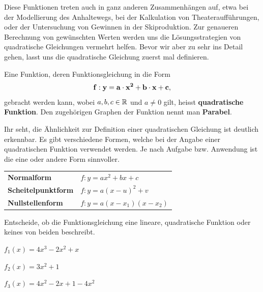 \documentclass[11pt,oneside]{article}
\begin{document}
	Diese Funktionen treten auch in ganz anderen Zusammenhängen auf, etwa bei der Modellierung des Anhaltewegs, bei der Kalkulation von Theateraufführungen, oder der Untersuchung von Gewinnen in der Skiproduktion. Zur genaueren Berechnung von gewünschten Werten werden uns die Lösungsstrategien von quadratische Gleichungen vermehrt helfen. Bevor wir aber zu sehr ins Detail gehen, lasst uns die quadratische Gleichung zuerst mal definieren.
	\begin{definition}
		Eine Funktion, deren Funktionsgleichung in die Form \[\mathbf{f:y=a\cdot x^2+b\cdot x+c,}\] gebracht werden kann, wobei $a,b,c\in\mathbb{R}$ und $a\neq0$ gilt, heisst \textbf{quadratische Funktion}.\newline
		Den zugehörigen Graphen der Funktion nennt man \textbf{Parabel}.
	\end{definition}
	Ihr seht, die Ähnlichkeit zur Definition einer quadratischen Gleichung ist deutlich erkennbar. Es gibt verschiedene Formen, welche bei der Angabe einer quadratischen Funktion verwendet werden. Je nach Aufgabe bzw. Anwendung ist die eine oder andere Form sinnvoller.
	\begin{definition}
		\begingroup
		\renewcommand{\arraystretch}{1.5}
		\begin{table}[H]
			\centering
			\begin{tabular}{p{7cm} l}
				\textbf{Normalform} & $\displaystyle f:y=ax^2+bx+c$ \\
				\textbf{Scheitelpunktform} & $\displaystyle f:y=a(x-u)^2+v$ \\
				\textbf{Nullstellenform} & $\displaystyle f:y=a(x-x_1)(x-x_2)$
			\end{tabular}
		\end{table}
		\endgroup
	\end{definition}
	\begin{aufgabe}
		Entscheide, ob die Funktionsgleichung eine lineare, quadratische Funktion oder keines von beiden beschreibt.
		\begin{enumcols}[3]
			\item $f_1(x)=4x^3-2x^2+x$
			\item $f_2(x)=3x^2+1$
			\item $f_3(x)=4x^2-2x+1-4x^2$
		\end{enumcols}
	\end{aufgabe}



\newpage
\end{document}
